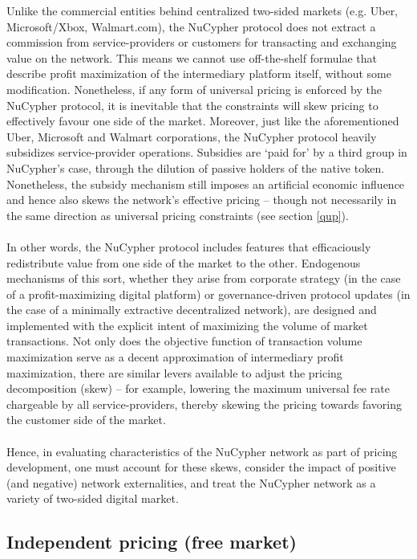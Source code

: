\documentclass[longbibliography,nofootinbib]{revtex4-1}
\begin{document}
Unlike the commercial entities behind centralized two-sided markets (e.g. Uber, Microsoft/Xbox, Walmart.com), the NuCypher protocol does not extract a commission from service-providers or customers for transacting and exchanging value on the network. This means we cannot use off-the-shelf formulae that describe profit maximization of the intermediary platform itself, without some modification. Nonetheless, if any form of universal pricing is enforced by the NuCypher protocol, it is inevitable that the constraints will skew pricing to effectively favour one side of the market. Moreover, just like the aforementioned Uber, Microsoft and Walmart corporations, the NuCypher protocol heavily subsidizes service-provider operations. Subsidies are ‘paid for’ by a third group in NuCypher’s case, through the dilution of passive holders of the native token. Nonetheless, the subsidy mechanism still imposes an artificial economic influence and hence also skews the network’s effective pricing – though not necessarily in the same direction as universal pricing constraints (see section \ref{qup}).
\\\\
In other words, the NuCypher protocol includes features that efficaciously redistribute value from one side of the market to the other. Endogenous mechanisms of this sort, whether they arise from corporate strategy (in the case of a profit-maximizing digital platform) or governance-driven protocol updates (in the case of a minimally extractive decentralized network), are designed and implemented with the explicit intent of maximizing the volume of market transactions. Not only does the objective function of transaction volume maximization serve as a decent approximation of intermediary profit maximization, there are similar levers available to adjust the pricing decomposition (skew) – for example, lowering the maximum universal fee rate chargeable by all service-providers, thereby skewing the pricing towards favoring the customer side of the market. 
\\\\
Hence, in evaluating characteristics of the NuCypher network as part of pricing development, one must account for these skews, consider the impact of positive (and negative) network externalities, and treat the NuCypher network as a variety of two-sided digital market. 

\subsection{Independent pricing (free market)} \label{fm}
\end{document}
